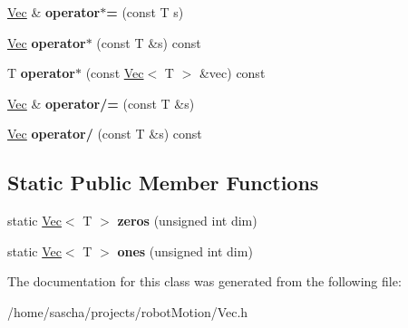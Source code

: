 \begin{DoxyCompactItemize}
\item 
\hypertarget{class_vec_a2f8233beca7fffb5a54d542cbfe16c58}{\hyperlink{class_vec}{Vec} \& {\bfseries operator$\ast$=} (const T s)}\label{class_vec_a2f8233beca7fffb5a54d542cbfe16c58}

\item 
\hypertarget{class_vec_a535ab892c23f56e3b424ee6e204b97a9}{\hyperlink{class_vec}{Vec} {\bfseries operator$\ast$} (const T \&s) const }\label{class_vec_a535ab892c23f56e3b424ee6e204b97a9}

\item 
\hypertarget{class_vec_a7b740646b704ce025a82f91d7d0a3cdf}{T {\bfseries operator$\ast$} (const \hyperlink{class_vec}{Vec}$<$ T $>$ \&vec) const }\label{class_vec_a7b740646b704ce025a82f91d7d0a3cdf}

\item 
\hypertarget{class_vec_a1abc12dec99b7f585812031e9f5993a5}{\hyperlink{class_vec}{Vec} \& {\bfseries operator/=} (const T \&s)}\label{class_vec_a1abc12dec99b7f585812031e9f5993a5}

\item 
\hypertarget{class_vec_a5828f5cf62a22af50ec996dc71be7f34}{\hyperlink{class_vec}{Vec} {\bfseries operator/} (const T \&s) const }\label{class_vec_a5828f5cf62a22af50ec996dc71be7f34}

\end{DoxyCompactItemize}
\subsection*{Static Public Member Functions}
\begin{DoxyCompactItemize}
\item 
\hypertarget{class_vec_a57fee6c2b6f1a5776eb1e3d827be8102}{static \hyperlink{class_vec}{Vec}$<$ T $>$ {\bfseries zeros} (unsigned int dim)}\label{class_vec_a57fee6c2b6f1a5776eb1e3d827be8102}

\item 
\hypertarget{class_vec_a72d924d53ebac6e34e2583d9074a0224}{static \hyperlink{class_vec}{Vec}$<$ T $>$ {\bfseries ones} (unsigned int dim)}\label{class_vec_a72d924d53ebac6e34e2583d9074a0224}

\end{DoxyCompactItemize}


The documentation for this class was generated from the following file\-:\begin{DoxyCompactItemize}
\item 
/home/sascha/projects/robot\-Motion/Vec.\-h\end{DoxyCompactItemize}
